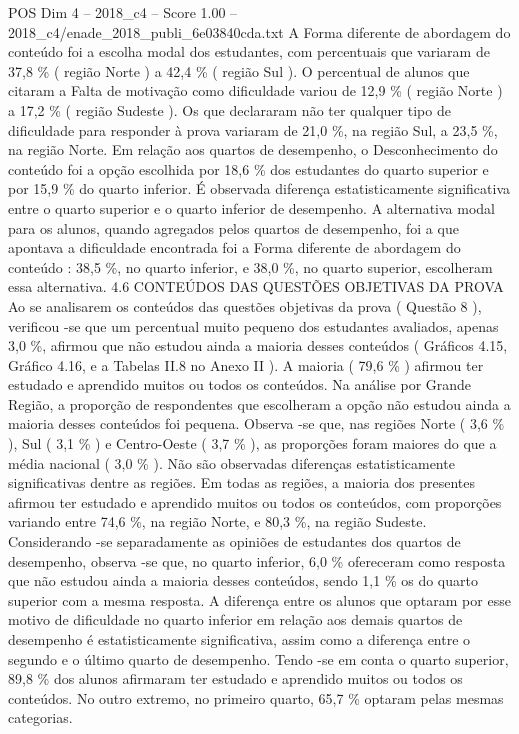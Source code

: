 \begin{textsample}{POS Dim 4 – 2018\_c4 – Score 1.00 – 2018\_c4/enade\_2018\_publi\_6e03840cda.txt}
A Forma diferente de abordagem do conteúdo foi a escolha modal dos estudantes, com percentuais que variaram de 37,8 \% ( região Norte ) a 42,4 \% ( região Sul ).
O percentual de alunos que citaram a Falta de motivação como dificuldade variou de 12,9 \% ( região Norte ) a 17,2 \% ( região Sudeste ).
Os que declararam não ter qualquer tipo de dificuldade para responder à prova variaram de 21,0 \%, na região Sul, a 23,5 \%, na região Norte.
Em relação aos quartos de desempenho, o Desconhecimento do conteúdo foi a opção escolhida por 18,6 \% dos estudantes do quarto superior e por 15,9 \% do quarto inferior.
É observada diferença estatisticamente significativa entre o quarto superior e o quarto inferior de desempenho.
A alternativa modal para os alunos, quando agregados pelos quartos de desempenho, foi a que apontava a dificuldade encontrada foi a Forma diferente de abordagem do conteúdo : 38,5 \%, no quarto inferior, e 38,0 \%, no quarto superior, escolheram essa alternativa. 4.6 CONTEÚDOS DAS QUESTÕES OBJETIVAS DA PROVA Ao se analisarem os conteúdos das questões objetivas da prova ( Questão 8 ), verificou -se que um percentual muito pequeno dos estudantes avaliados, apenas 3,0 \%, afirmou que não estudou ainda a maioria desses conteúdos ( Gráficos 4.15, Gráfico 4.16, e a Tabelas II.8 no Anexo II ).
A maioria ( 79,6 \% ) afirmou ter estudado e aprendido muitos ou todos os conteúdos.
Na análise por Grande Região, a proporção de respondentes que escolheram a opção não estudou ainda a maioria desses conteúdos foi pequena.
Observa -se que, nas regiões Norte ( 3,6 \% ), Sul ( 3,1 \% ) e Centro-Oeste ( 3,7 \% ), as proporções foram maiores do que a média nacional ( 3,0 \% ).
Não são observadas diferenças estatisticamente significativas dentre as regiões.
Em todas as regiões, a maioria dos presentes afirmou ter estudado e aprendido muitos ou todos os conteúdos, com proporções variando entre 74,6 \%, na região Norte, e 80,3 \%, na região Sudeste.
Considerando -se separadamente as opiniões de estudantes dos quartos de desempenho, observa -se que, no quarto inferior, 6,0 \% ofereceram como resposta que não estudou ainda a maioria desses conteúdos, sendo 1,1 \% os do quarto superior com a mesma resposta.
A diferença entre os alunos que optaram por esse motivo de dificuldade no quarto inferior em relação aos demais quartos de desempenho é estatisticamente significativa, assim como a diferença entre o segundo e o último quarto de desempenho.
Tendo -se em conta o quarto superior, 89,8 \% dos alunos afirmaram ter estudado e aprendido muitos ou todos os conteúdos.
No outro extremo, no primeiro quarto, 65,7 \% optaram pelas mesmas categorias.

\end{textsample}
